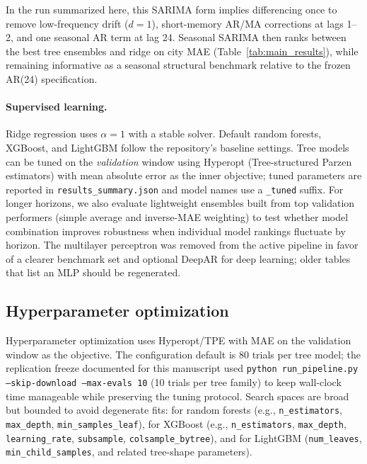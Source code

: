 \documentclass[11pt,a4paper]{article}
\begin{document}
In the run summarized here, this SARIMA form implies differencing once to remove low-frequency drift ($d=1$), short-memory AR/MA corrections at lags 1--2, and one seasonal AR term at lag 24. Seasonal SARIMA then ranks between the best tree ensembles and ridge on city MAE (Table~\ref{tab:main_results}), while remaining informative as a seasonal structural benchmark relative to the frozen AR(24) specification.

\paragraph{Supervised learning.}
Ridge regression uses $\alpha=1$ with a stable solver. Default random forests, XGBoost, and LightGBM follow the repository’s baseline settings. Tree models can be tuned on the \emph{validation} window using Hyperopt (Tree-structured Parzen estimators) with mean absolute error as the inner objective; tuned parameters are reported in \texttt{results\_summary.json} and model names use a \texttt{\_tuned} suffix. For longer horizons, we also evaluate lightweight ensembles built from top validation performers (simple average and inverse-MAE weighting) to test whether model combination improves robustness when individual model rankings fluctuate by horizon. The multilayer perceptron was removed from the active pipeline in favor of a clearer benchmark set and optional DeepAR for deep learning; older tables that list an MLP should be regenerated.

\subsection{Hyperparameter optimization}

Hyperparameter optimization uses Hyperopt/TPE with MAE on the validation window as the objective. The configuration default is 80 trials per tree model; the replication freeze documented for this manuscript used \texttt{python run\_pipeline.py --skip-download --max-evals 10} (10 trials per tree family) to keep wall-clock time manageable while preserving the tuning protocol. Search spaces are broad but bounded to avoid degenerate fits: for random forests (e.g., \texttt{n\_estimators}, \texttt{max\_depth}, \texttt{min\_samples\_leaf}), for XGBoost (e.g., \texttt{n\_estimators}, \texttt{max\_depth}, \texttt{learning\_rate}, \texttt{subsample}, \texttt{colsample\_bytree}), and for LightGBM (\texttt{num\_leaves}, \texttt{min\_child\_samples}, and related tree-shape parameters).
\end{document}
